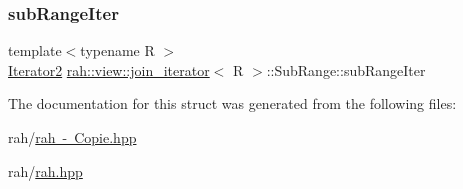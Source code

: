 \mbox{\label{structrah_1_1view_1_1join__iterator_1_1_sub_range_a4073148b86fc958e754b23af1befce93}} 
\subsubsection{\texorpdfstring{subRangeIter}{subRangeIter}}
{\footnotesize\ttfamily template$<$typename R $>$ \\
\mbox{\hyperlink{structrah_1_1view_1_1join__iterator_ae03a066174f3422c70d0e3c22e68d9f7}{Iterator2}} \mbox{\hyperlink{structrah_1_1view_1_1join__iterator}{rah\+::view\+::join\+\_\+iterator}}$<$ R $>$\+::Sub\+Range\+::sub\+Range\+Iter}



The documentation for this struct was generated from the following files\+:\begin{DoxyCompactItemize}
\item 
rah/\mbox{\hyperlink{rah_01-_01_copie_8hpp}{rah -\/ Copie.\+hpp}}\item 
rah/\mbox{\hyperlink{rah_8hpp}{rah.\+hpp}}\end{DoxyCompactItemize}

